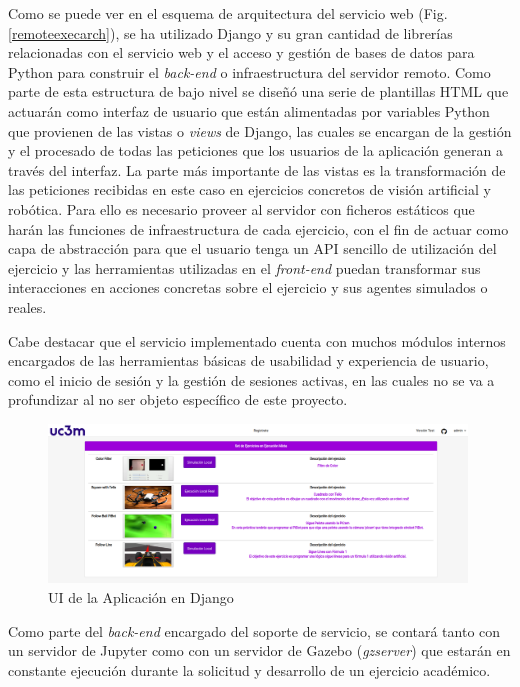 Como se puede ver en el esquema de arquitectura del servicio web (Fig. \ref{remoteexecarch}), se ha utilizado Django y su gran cantidad de librerías relacionadas con el servicio web y el acceso y gestión de bases de datos para Python para construir el \textit{back-end} o infraestructura del servidor remoto. Como parte de esta estructura de bajo nivel se diseñó una serie de plantillas HTML que actuarán como interfaz de usuario que están alimentadas por variables Python que provienen de las vistas o \textit{views} de Django, las cuales se encargan de la gestión y el procesado de todas las peticiones que los usuarios de la aplicación generan a través del interfaz. La parte más importante de las vistas es la transformación de las peticiones recibidas en este caso en ejercicios concretos de visión artificial y robótica. Para ello es necesario proveer al servidor con ficheros estáticos que harán las funciones de infraestructura de cada ejercicio, con el fin de actuar como capa de abstracción para que el usuario tenga un API sencillo de utilización del ejercicio y las herramientas utilizadas en el \textit{front-end} puedan transformar sus interacciones en acciones concretas sobre el ejercicio y sus agentes simulados o reales.

Cabe destacar que el servicio implementado cuenta con muchos módulos internos encargados de las herramientas básicas de usabilidad y experiencia de usuario, como el inicio de sesión y la gestión de sesiones activas, en las cuales no se va a profundizar al no ser objeto específico de este proyecto.

\begin{figure}[!hbtp]  \centering\noindent
    \includegraphics[width=0.99\textwidth]{figures/app_ui.png}
    \caption{UI de la Aplicación en Django}
    \label{appui}
\end{figure}

Como parte del \textit{back-end} encargado del soporte de servicio, se contará tanto con un servidor de Jupyter como con un servidor de Gazebo (\textit{gzserver}) que estarán en constante ejecución durante la solicitud y desarrollo de un ejercicio académico. 

